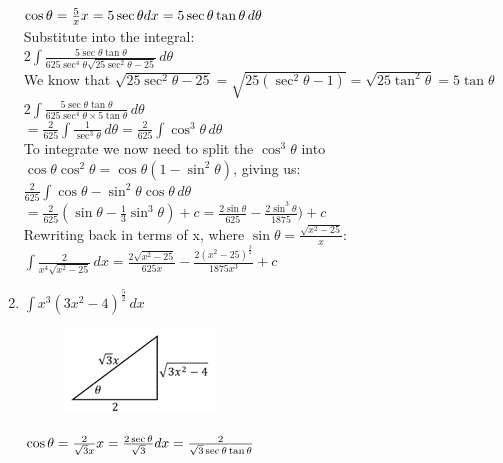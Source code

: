 \documentclass[../main.tex]{subfiles}
\begin{document}
\begin{enumerate}
    \(\cos{\theta}=\frac{5}{x}\\
    x=5\sec{\theta}\\
    dx=5\sec{\theta}\tan{\theta}\,d\theta\)\\

    Substitute into the integral:\\
    \(2\int \frac{5\sec{\theta}\tan{\theta}}{625\sec^4{\theta}\sqrt{25\sec^2{\theta}-25}}\,d\theta\)\\

    We know that \(\sqrt{25\sec^2{\theta}-25}=\sqrt{25(\sec^2{\theta}-1)}=\sqrt{25\tan^2{\theta}}=5\tan{\theta}\)\\

    \(2\int \frac{5\sec{\theta}\tan{\theta}}{625\sec^4{\theta}\times 5\tan{\theta}}\,d\theta\)\\

    \(=\frac{2}{625}\int \frac{1}{\sec^3{\theta}}\,d\theta=\frac{2}{625}\int \cos^3{\theta}\,d\theta\)\\

    To integrate we now need to split the \(\cos^3{\theta}\) into \(\cos{\theta}\cos^2{\theta}=\cos{\theta}(1-\sin^2{\theta})\), giving us:\\
    \(\frac{2}{625}\int \cos{\theta}-\sin^2{\theta}\cos{\theta}\,d\theta\)\\

    \(=\frac{2}{625}(\sin{\theta}-\frac{1}{3}\sin^3{\theta})+c=\frac{2\sin{\theta}}{625}-\frac{2\sin^3{\theta}}{1875})+c\)\\

    Rewriting back in terms of x, where \(\sin{\theta}=\frac{\sqrt{x^2-25}}{x}\):\\
    \(\int \frac{2}{x^4\sqrt{x^2-25}}\,dx=\frac{2\sqrt{x^2-25}}{625x}-\frac{2(x^2-25)^\frac{3}{2}}{1875x^3}+c\)\\

    \item 
    \(\int x^3(3x^2-4)^{\frac{5}{2}}\,dx\)
    \begin{figure}[h]
        \includegraphics{images/trigsuba6.png}
    \end{figure}

    \(\cos{\theta}=\frac{2}{\sqrt{3}x}\\
    x=\frac{2\sec{\theta}}{\sqrt{3}}\\
    dx=\frac{2}{\sqrt{3}\sec{\theta}\tan{\theta}}\)\\


\end{enumerate}
\end{document}

